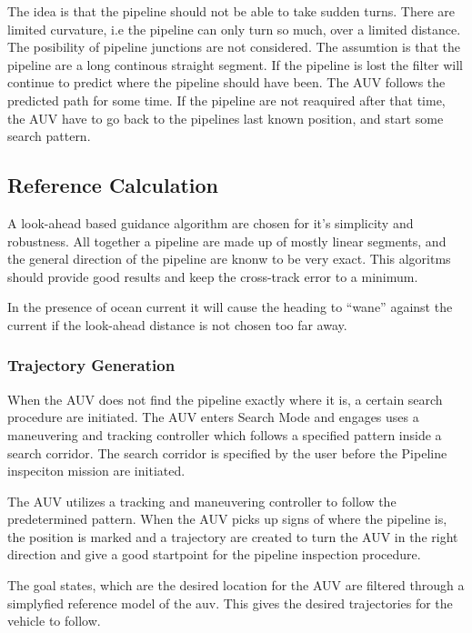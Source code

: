 		The idea is that the pipeline should not be able to take sudden turns. There are limited
		curvature, i.e the pipeline can only turn so much, over a limited distance. The posibility of
		pipeline junctions are not considered. The assumtion is that the pipeline are a long continous
		straight segment. If the pipeline is lost the filter will continue to predict where the
		pipeline should have been. The AUV follows the predicted path for some time. If the pipeline
		are not reaquired after that time, the AUV have to go back to the pipelines last known
		position, and start some search pattern.

		
	

	\subsection{Reference Calculation}
		A look-ahead based guidance algorithm are chosen for it's simplicity and robustness. All
		together a pipeline are made up of mostly linear segments, and the general direction of the
		pipeline are knonw to be very exact. This algoritms should provide good results and keep 
		the cross-track error to a minimum.

		In the presence of ocean current it will cause the heading to ``wane'' against the current if
		the look-ahead distance is not chosen too far away. 
		
	
	
	\subsubsection{Trajectory Generation}
		When the AUV does not find the pipeline exactly where it is, a certain search procedure are initiated.
		The AUV enters Search Mode and engages uses a maneuvering and tracking controller which follows a
		specified pattern inside a search corridor. The search corridor is specified by the user before the
		Pipeline inspeciton mission are initiated. 

		The AUV utilizes a tracking and maneuvering controller to follow the predetermined pattern. When the
		AUV picks up signs of where the pipeline is, the position is marked and a trajectory are created to
		turn the AUV in the right direction and give a good startpoint for the pipeline inspection procedure. 
	
		The goal states, which are the desired location for the AUV are filtered through a simplyfied
		reference model of the auv. This gives the desired trajectories for the vehicle to follow.
	
